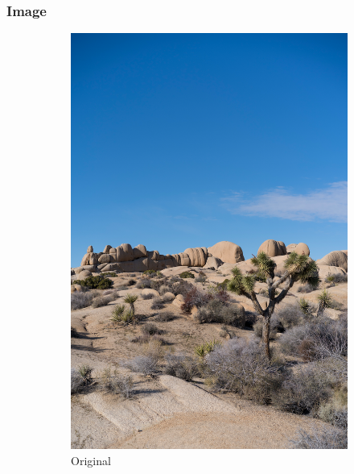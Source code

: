 \documentclass{article}
\begin{document}
\subsubsection{Image}


\begin{figure}[htb]
    \centering
    \begin{subfigure}[b]{0.32\textwidth}
        \centering
        \includegraphics[width=\textwidth]{../Resource/image.png}
        \caption{Original}
        \label{fig:image-linear-bsc-original}
    \end{subfigure}
    \hfill
    \begin{subfigure}[b]{0.32\textwidth}
        \centering

\end{subfigure}
\end{figure}
\end{document}
